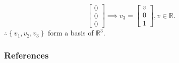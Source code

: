 \documentclass[
    8pt,
    aspectratio=1610,
    c,
    intlimits,
		handout,
    leqno,
    professionalfonts,
]{beamer}
\begin{document}
\begin{frame}
\begin{equation*}
\begin{bmatrix}
			0 \\
			0 \\
			0
		\end{bmatrix}\implies
		v_{3}=
		\begin{bmatrix}
			v \\
			0 \\
			1
		\end{bmatrix},v\in\mathbb{R}.
	\end{equation*}
	$\therefore\left\{v_{1},v_{2},v_{3}\right\}$ form a basis of $\mathbb{R}^{3}$.

\end{frame}

\begin{frame}
	\frametitle{References}

	\nocite{*}
	\printbibliography[heading=none]
\end{frame}
\end{document}
